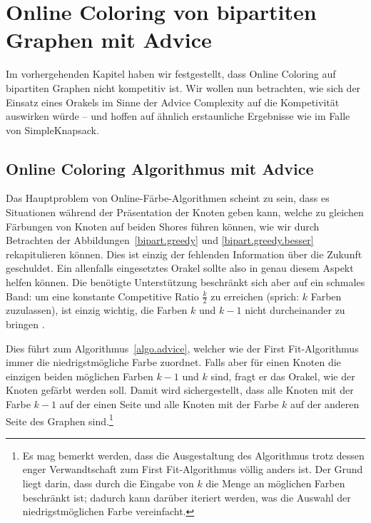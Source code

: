 \documentclass[11pt,abstracton]{scrreprt} %
\theoremstyle{definition}
\begin{document}
\begin{figure}
\begin{center}
\end{center}
\end{figure}


\chapter{Online Coloring von bipartiten Graphen mit Advice}

Im vorhergehenden Kapitel haben wir festgestellt, dass Online Coloring auf bipartiten Graphen nicht kompetitiv ist. Wir wollen nun betrachten, wie sich der Einsatz eines Orakels im Sinne der Advice Complexity auf die Kompetivität auswirken würde -- und hoffen auf ähnlich erstaunliche Ergebnisse wie im Falle von {\sc SimpleKnapsack}.

\section{Online Coloring Algorithmus mit Advice}

\bigskip
Das Hauptproblem von Online-Färbe-Algorithmen scheint zu sein, dass es Situationen während der Präsentation der Knoten geben kann, welche zu gleichen Färbungen von Knoten auf beiden Shores führen können, wie wir durch Betrachten der Abbildungen~\ref{bipart.greedy} und \ref{bipart.greedy.besser} rekapitulieren können. Dies ist einzig der fehlenden Information über die Zukunft geschuldet. Ein allenfalls eingesetztes Orakel sollte also in genau diesem Aspekt helfen können. Die benötigte Unterstützung beschränkt sich aber auf ein schmales Band: um eine konstante Competitive Ratio $\frac k 2$ zu erreichen (sprich: $k$ Farben zuzulassen), ist einzig wichtig, die Farben $k$ und $k-1$ nicht durcheinander zu bringen \cite{bipartite}.

\bigskip
Dies führt zum Algorithmus~\ref{algo.advice}, welcher wie der First Fit-Algorithmus immer die niedrigstmögliche Farbe zuordnet. Falls aber für einen Knoten die einzigen beiden möglichen Farben $k-1$ und $k$ sind, fragt er das Orakel, wie der Knoten gefärbt werden soll. Damit wird sichergestellt, dass alle Knoten mit der Farbe $k-1$ auf der einen Seite und alle Knoten mit der Farbe $k$ auf der anderen Seite des Graphen sind.\footnote{Es mag bemerkt werden, dass die Ausgestaltung des Algorithmus trotz dessen enger Verwandtschaft zum First Fit-Algorithmus völlig anders ist. Der Grund liegt darin, dass durch die Eingabe von $k$ die Menge an möglichen Farben beschränkt ist; dadurch kann darüber iteriert werden, was die Auswahl der niedrigstmöglichen Farbe vereinfacht.}
\end{document}
